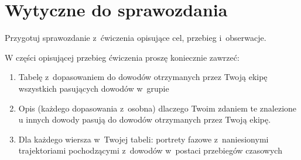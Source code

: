 \documentclass{sprawozdanie-agh}
\begin{document}

\section{Wytyczne do sprawozdania}

Przygotuj sprawozdanie z~ćwiczenia opisujące cel, przebieg i~obserwacje.

W części opisującej przebieg ćwiczenia proszę koniecznie zawrzeć:    
\begin{enumerate}
        \item Tabelę z~dopasowaniem do dowodów otrzymanych przez Twoją ekipę wszystkich pasujących dowodów w~grupie
        \item Opis (każdego dopasowania z~osobna) dlaczego Twoim zdaniem te znalezione u innych dowody pasują do dowodów otrzymanych przez Twoją ekipę. 
        \item Dla każdego wiersza w~Twojej tabeli: portrety fazowe z~naniesionymi trajektoriami pochodzącymi z~dowodów w~postaci przebiegów czasowych 
\end{enumerate}


\end{document}
